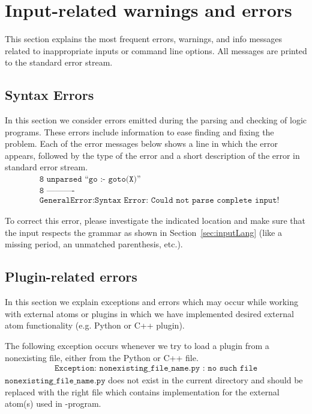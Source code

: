\documentclass[a4paper, titlepage]{article}
\DeclareMathOperator{\leftimpl}{:-}
\begin{document}
\section{Input-related warnings and errors}
\label{sec:inputRelatedWarnings}
This section explains the most frequent errors, warnings, and info messages related
to inappropriate inputs or command line options. All messages are printed to the
standard error stream.

\subsection{Syntax Errors}
In this section we consider errors emitted during the parsing and checking of logic programs.
These errors include information to ease finding and fixing the problem. Each of the error messages below
shows a line in which the error appears, followed by the type of the error and a short description of the error in standard error stream.
\begin{align*}
 & \texttt{8 \ unparsed \  ``go $\leftimpl$ goto(X)'' }\\
 & \texttt{8 ----------$\widehat{}$} \\
 & \texttt{GeneralError:Syntax \ Error: \ Could \ not \ parse \ complete \ input!}
\end{align*}

To correct this error, please investigate the indicated location and make sure that the input respects the grammar as shown in Section~\ref{sec:inputLang} (like a missing period, an unmatched parenthesis,
etc.).

\subsection{Plugin-related errors}
In this section we explain exceptions and errors 
which may occur while working with external atoms 
or plugins in which we have implemented desired external atom functionality (e.g. Python or C++ plugin). 

The following exception occurs whenever we try to
load a plugin from a nonexisting file, either from the Python or C++ file.
\begin{align*}
\texttt{Exception: nonexisting\_file\_name.py : no such file}
\end{align*}
$\texttt{nonexisting\_file\_name.py}$ does not exist in the current directory and should be replaced with
the right file which contains implementation for the external atom(s) used in \hex{}-program.
\end{document}
